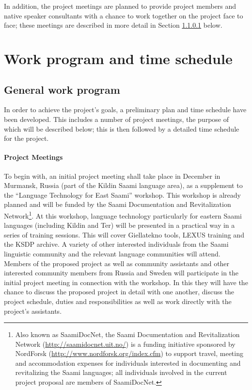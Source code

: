 \documentclass[a4paper,12pt]{article}
\begin{document}
{{{{In addition, the project meetings are planned to provide project members and native speaker consultants with a chance to work together on the project face to face; these meetings are described in more detail in Section \ref{meetings} below.

\section{Work program and time schedule}
\subsection{General work program}

In order to achieve the project's goals, a preliminary plan and time schedule have been developed. This includes a number of project meetings, the purpose of which will be described below; this is then followed by a detailed time schedule for the project.

\paragraph{Project Meetings}\label{meetings}
To begin with, an initial project meeting shall take place in December in Murmansk, Russia (part of the Kildin Saami language area), as a supplement to the “Language Technology for East Saami” workshop. This workshop is already planned and will be funded by the Saami Documentation and Revitalization Network\footnote{Also known as SaamiDocNet, the Saami Documentation and Revitalization Network (\url{http://saamidocnet.uit.no/}) is a funding initiative sponsored by NordForsk (\url{http://www.nordforsk.org/index.cfm}) to support travel, meeting and accommodation expenses for individuals interested in documenting and revitalizing the Saami languages; all individuals involved in the current project proposal are members of SaamiDocNet.}. At this workshop, language technology particularly for eastern Saami languages (including Kildin and Ter) will be presented in a practical way in a series of training sessions. This will cover Giellatekno tools, LEXUS training and the KSDP archive. A variety of other interested individuals from the Saami linguistic community and the relevant language communities will attend. Members of the proposed project as well as community assistants and other interested community members from Russia and Sweden will participate in the initial project meeting in connection with the workshop. In this they will have the chance to discuss the proposed project in detail with one another, discuss the project schedule, duties and responsibilities as well as work directly with the project's assistants.

}}}}
\end{document}
